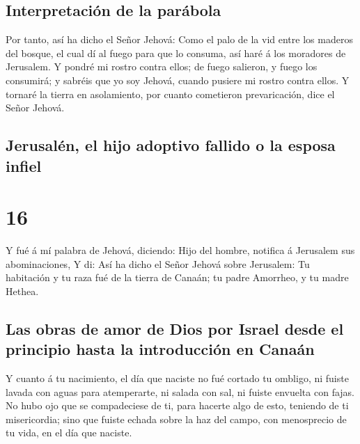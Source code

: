 \hypertarget{interpretaciuxf3n-de-la-paruxe1bola}{%
\subsection{Interpretación de la
parábola}\label{interpretaciuxf3n-de-la-paruxe1bola}}

 Por tanto, así ha dicho el Señor Jehová: Como el palo de
la vid entre los maderos del bosque, el cual dí al fuego para que lo
consuma, así haré á los moradores de Jerusalem.  Y pondré
mi rostro contra ellos; de fuego salieron, y fuego los consumirá; y
sabréis que yo soy Jehová, cuando pusiere mi rostro contra ellos.
 Y tornaré la tierra en asolamiento, por cuanto cometieron
prevaricación, dice el Señor Jehová.

\hypertarget{jerusaluxe9n-el-hijo-adoptivo-fallido-o-la-esposa-infiel}{%
\subsection{Jerusalén, el hijo adoptivo fallido o la esposa
infiel}\label{jerusaluxe9n-el-hijo-adoptivo-fallido-o-la-esposa-infiel}}

\hypertarget{section-15}{%
\section{16}\label{section-15}}

 Y fué á mí palabra de Jehová, diciendo: 
Hijo del hombre, notifica á Jerusalem sus abominaciones, 
Y di: Así ha dicho el Señor Jehová sobre Jerusalem: Tu habitación y tu
raza fué de la tierra de Canaán; tu padre Amorrheo, y tu madre Hethea.

\hypertarget{las-obras-de-amor-de-dios-por-israel-desde-el-principio-hasta-la-introducciuxf3n-en-canauxe1n}{%
\subsection{Las obras de amor de Dios por Israel desde el principio
hasta la introducción en
Canaán}\label{las-obras-de-amor-de-dios-por-israel-desde-el-principio-hasta-la-introducciuxf3n-en-canauxe1n}}

 Y cuanto á tu nacimiento, el día que naciste no fué
cortado tu ombligo, ni fuiste lavada con aguas para atemperarte, ni
salada con sal, ni fuiste envuelta con fajas.  No hubo ojo
que se compadeciese de ti, para hacerte algo de esto, teniendo de ti
misericordia; sino que fuiste echada sobre la haz del campo, con
menosprecio de tu vida, en el día que naciste.

